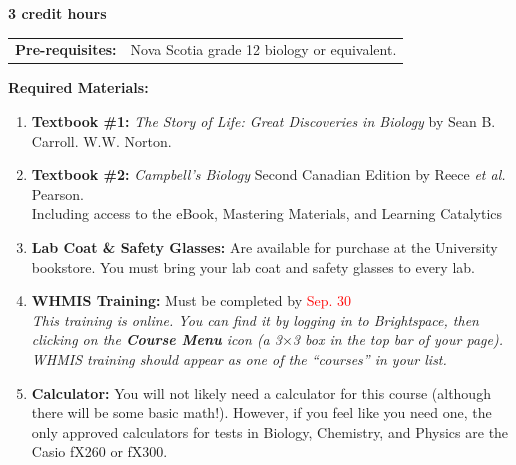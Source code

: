 \documentclass[hidelinks]{article}
\begin{document}
	\textbf{3 credit hours}

	\begin{tabular}{@{} p{2.6cm} l }
		\textbf{Pre-requisites:} & Nova Scotia grade 12 biology or equivalent.\\ 
	\end{tabular}


	\textbf{Required Materials:}
	\begin{enumerate}[topsep=-8pt]
		\item \textbf{Textbook \#1:} \emph{The Story of Life: Great Discoveries in Biology} by Sean B. Carroll. W.W. Norton.
		\item \textbf{Textbook \#2:} \emph{Campbell's Biology} Second Canadian Edition by Reece \emph{et al.} Pearson.\\
				Including access to the eBook, Mastering Materials, and Learning Catalytics
		\item \textbf{Lab Coat \& Safety Glasses:} Are available for purchase at the University bookstore. You must bring your lab coat and safety glasses to every lab.
		\item \textbf{WHMIS Training:} Must be completed by \textcolor{red}{Sep. 30}\\
				\emph{This training is online. You can find it by logging in to Brightspace, then clicking on the \textbf{Course Menu} icon (a 3$\times$3 box in the top bar of your page). WHMIS training should appear as one of the ``courses'' in your list.}		
		\item \textbf{Calculator:} You will not likely need a calculator for this course (although there will be some basic math!). However, if you feel like you need one, the only approved calculators for tests in Biology, Chemistry, and Physics are the Casio fX260 or fX300.\\
	\end{enumerate}	
\end{document}
